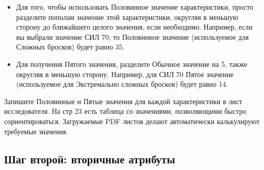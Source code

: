 \documentclass[letterpaper,twocolumn,openany, twoside, 11pt, usenames]{cocbook}
\begin{document}
\begin{itemize}[leftmargin=4mm]
  \item Для того, чтобы использовать Половинное значение характеристики, просто разделите пополам значение этой характеристики, округляя в меньшую сторону до ближайшего целого значения, если необходимо. Например, если вы выбрали значение СИЛ 70, то Половинное значение (используемое для Сложных бросков) будет равно 35.
  \item Для получения Пятого значения, разделите Обычное значение на 5, также округляя в меньшую сторону. Например, для СИЛ 70 Пятое значение (используемое для Экстремально сложных бросков) будет равно 14.
\end{itemize}

Запишите Половинные и Пятые значения для каждой характеристики в лист исследователя. На стр 23 есть таблица со значениями, позволяющими быстро сориентироваться. Загружаемые PDF листов делают автоматически калькулируют требуемые значения.

\subsection*{Шаг второй: вторичные атрибуты}
\end{document}
